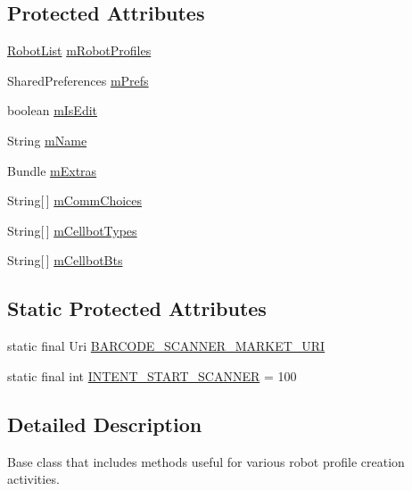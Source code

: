 \subsection*{Protected Attributes}
\begin{DoxyCompactItemize}
\item 
\hyperlink{classcom_1_1cellbots_1_1_robot_list}{Robot\-List} \hyperlink{classcom_1_1cellbots_1_1_robot_base_create_a84275e4b962c1fe41e54ebf19f2e57d3}{m\-Robot\-Profiles}
\item 
Shared\-Preferences \hyperlink{classcom_1_1cellbots_1_1_robot_base_create_a67e665a1fb6390ef9611ef49c37d565a}{m\-Prefs}
\item 
boolean \hyperlink{classcom_1_1cellbots_1_1_robot_base_create_a5093176d9dc3caf9fe69b9acf559a7df}{m\-Is\-Edit}
\item 
String \hyperlink{classcom_1_1cellbots_1_1_robot_base_create_ada07a21cae8d09e6747da5d39d6bfd8e}{m\-Name}
\item 
Bundle \hyperlink{classcom_1_1cellbots_1_1_robot_base_create_a55c7d7396c6382fb2c43c03a8326e8de}{m\-Extras}
\item 
String\mbox{[}$\,$\mbox{]} \hyperlink{classcom_1_1cellbots_1_1_robot_base_create_a2d9ebfd2f0fbbb3ae015a8693e0a5314}{m\-Comm\-Choices}
\item 
String\mbox{[}$\,$\mbox{]} \hyperlink{classcom_1_1cellbots_1_1_robot_base_create_a83b5a7890ea7a107403eb9b7eab71ae9}{m\-Cellbot\-Types}
\item 
String\mbox{[}$\,$\mbox{]} \hyperlink{classcom_1_1cellbots_1_1_robot_base_create_a60382b286edc68e4d6544aac289543fb}{m\-Cellbot\-Bts}
\end{DoxyCompactItemize}
\subsection*{Static Protected Attributes}
\begin{DoxyCompactItemize}
\item 
static final Uri \hyperlink{classcom_1_1cellbots_1_1_robot_base_create_a0fd425bbaf0c1a2f3880880fa7110564}{B\-A\-R\-C\-O\-D\-E\-\_\-\-S\-C\-A\-N\-N\-E\-R\-\_\-\-M\-A\-R\-K\-E\-T\-\_\-\-U\-R\-I}
\item 
static final int \hyperlink{classcom_1_1cellbots_1_1_robot_base_create_ae34863efd6d16b8564ddbfe450afafda}{I\-N\-T\-E\-N\-T\-\_\-\-S\-T\-A\-R\-T\-\_\-\-S\-C\-A\-N\-N\-E\-R} = 100
\end{DoxyCompactItemize}


\subsection{Detailed Description}
Base class that includes methods useful for various robot profile creation activities.

